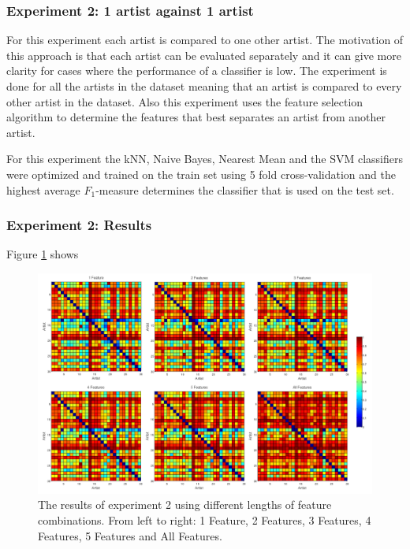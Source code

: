 \subsubsection{Experiment 2: 1 artist against 1 artist}
For this experiment each artist is compared to one other artist.
The motivation of this approach is that each artist can be evaluated separately and it can give more clarity for cases where the performance of a classifier is low.
The experiment is done for all the artists in the dataset meaning that an artist is compared to every other artist in the dataset.
Also this experiment uses the feature selection algorithm to determine the features that best separates an artist from another artist.

For this experiment the kNN, Naive Bayes, Nearest Mean and the SVM classifiers were optimized and trained on the train set using 5 fold cross-validation and the highest average $F_1$-measure determines the classifier that is used on the test set.

\subsubsection{Experiment 2: Results}

Figure \ref{fig:experiment2results} shows

\begin{figure}[htb]
  \centering
  \includegraphics[width=1\linewidth]{img/experiment2results.png}
  \caption{The results of experiment 2 using different lengths of feature combinations. From left to right: 1 Feature, 2 Features, 3 Features, 4 Features, 5 Features and All Features.}
  \label{fig:experiment2results}
\end{figure}


